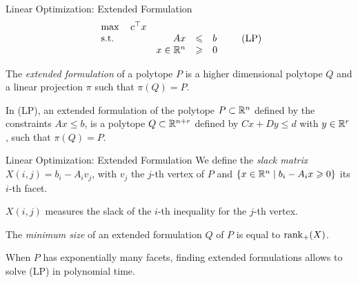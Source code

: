 \begin{frame}{Linear Optimization: Extended Formulation}
\[
\begin{array}{l@{\quad}rcl}
\max \quad c^\top x&&& \\
\textnormal{s.t.} & Ax & \leqslant & b\\
& x \in \real^n & \geqslant & 0
\end{array}
\tag{LP}
\]
\begin{defn}
The \emph{extended formulation} of a polytope $P$ is a higher dimensional polytope $Q$ and a linear projection $\pi$ such that $\pi(Q) = P$.
\end{defn}
In (LP), an extended formulation of the polytope $P \subset \mathbb{R}^n$ defined by the constraints $Ax\leqslant b$, is a polytope $Q\subset \mathbb{R}^{n+r}$ defined by $Cx+Dy \leqslant d$ with $y\in \mathbb{R}^r$, such that $\pi(Q) = P$.

\end{frame}

\begin{frame}{Linear Optimization: Extended Formulation}
We define the \emph{slack matrix} $X(i,j) = b_i-A_iv_j$, with $v_j$ the $j$-th vertex of $P$ and $\{x\in \mathbb{R}^n \mid b_i-A_ix\geqslant 0\}$ its $i$-th facet.

\(X(i, j)\) measures the slack of the $i$-th inequality for the $j$-th vertex.

\begin{thm}[Yannakis]
The \emph{minimum size} of an extended formulation $Q$ of $P$ is equal to $\operatorname{rank}_+(X)$.
\end{thm}

When $P$ has exponentially many facets, finding extended formulations allows to solve (LP) in polynomial time.
\end{frame}